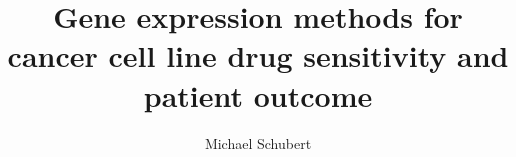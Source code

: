 \documentclass[a4paper, headinclude, footinclude, hidelinks, BCOR=1cm]{scrbook}
\title{Gene expression methods for cancer cell line drug sensitivity and patient outcome}
\author{Michael Schubert}
\begin{document}

\maketitle

\begingroup
    \tableofcontents
    \cleardoublepage
\endgroup

%













\backmatter

\printbibliography[heading=bibintoc]

\begin{appendices}



\end{appendices}
\end{document}
